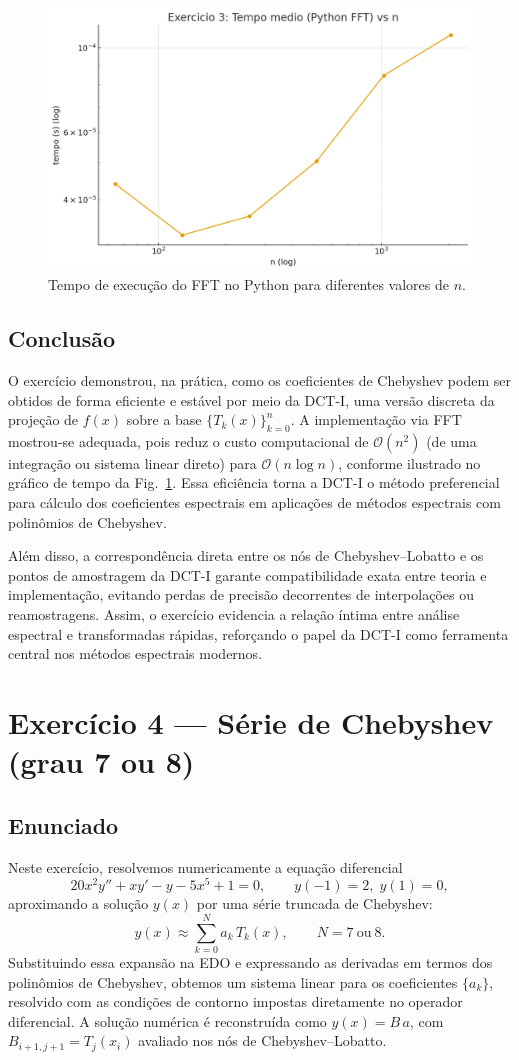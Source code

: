 \documentclass[11pt,a4paper]{article}
\begin{document}
\begin{figure}[h!]\centering
\includegraphics[width=0.7\linewidth]{figures/ex3_timing.png}
\caption{Tempo de execução do FFT no Python para diferentes valores de $n$.}
\label{fig:ex3_timing}
\end{figure}

\subsection*{Conclusão}
O exercício demonstrou, na prática, como os coeficientes de Chebyshev podem ser obtidos de forma 
eficiente e estável por meio da DCT-I, uma versão discreta da projeção de $f(x)$ sobre a base 
$\{T_k(x)\}_{k=0}^n$. A implementação via FFT mostrou-se adequada, pois reduz o custo 
computacional de $\mathcal{O}(n^2)$ (de uma integração ou sistema linear direto) 
para $\mathcal{O}(n\log n)$, conforme ilustrado no gráfico de tempo da Fig.~\ref{fig:ex3_timing}. 
Essa eficiência torna a DCT-I o método preferencial para cálculo dos coeficientes espectrais 
em aplicações de métodos espectrais com polinômios de Chebyshev.

Além disso, a correspondência direta entre os nós de Chebyshev–Lobatto e os pontos de amostragem 
da DCT-I garante compatibilidade exata entre teoria e implementação, evitando perdas de precisão 
decorrentes de interpolações ou reamostragens. Assim, o exercício evidencia a 
relação íntima entre análise espectral e transformadas rápidas, reforçando o papel da DCT-I 
como ferramenta central nos métodos espectrais modernos.



\section{Exercício 4 — Série de Chebyshev (grau 7 ou 8)}

\subsection*{Enunciado}
Neste exercício, resolvemos numericamente a equação diferencial
\[
20x^2 y'' + x y' - y - 5x^5 + 1 = 0, \qquad y(-1)=2,\; y(1)=0,
\]
aproximando a solução $y(x)$ por uma série truncada de Chebyshev:
\[
y(x) \approx \sum_{k=0}^{N} a_k\,T_k(x), \qquad N=7\ \text{ou}\ 8.
\]
Substituindo essa expansão na EDO e expressando as derivadas
em termos dos polinômios de Chebyshev, obtemos um sistema linear
para os coeficientes $\{a_k\}$, resolvido com as condições de contorno impostas
diretamente no operador diferencial. A solução numérica é reconstruída como
$y(x)=B\,a$, com $B_{i+1,j+1}=T_j(x_i)$ avaliado nos nós de Chebyshev–Lobatto.
\end{document}
